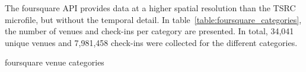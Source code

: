 The foursquare API provides data at a higher spatial resolution than the TSRC microfile, but without the temporal detail. In table~\ref{table:foursquare_categories}, the number of venues and check-ins per category are presented. In total, 34,041 unique venues and 7,981,458 check-ins were collected for the different categories.


\begin{sidewaystable}[]
\centering
\caption{foursquare venue categories}
\label{table:foursquare_categories}

\centering %


\end{sidewaystable}
